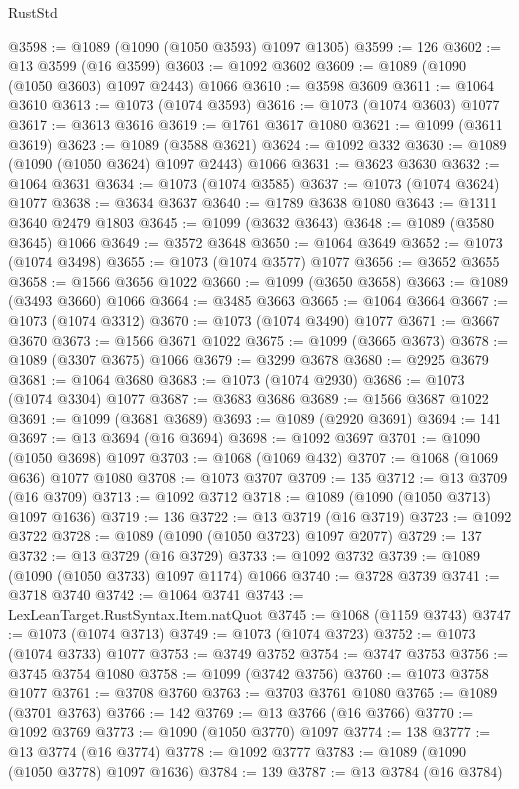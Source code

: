\begin{lexlean}{RustStd}
\begin{coremodule}
{\begin{coremodule}
{{{{{{{{{{{{{{@3598 := @1089 (@1090 (@1050 @3593) @1097 @1305)
@3599 := 126
@3602 := @13 @3599 (@16 @3599)
@3603 := @1092 @3602
@3609 := @1089 (@1090 (@1050 @3603) @1097 @2443) @1066
@3610 := @3598 @3609
@3611 := @1064 @3610
@3613 := @1073 (@1074 @3593)
@3616 := @1073 (@1074 @3603) @1077
@3617 := @3613 @3616
@3619 := @1761 @3617 @1080
@3621 := @1099 (@3611 @3619)
@3623 := @1089 (@3588 @3621)
@3624 := @1092 @332
@3630 := @1089 (@1090 (@1050 @3624) @1097 @2443) @1066
@3631 := @3623 @3630
@3632 := @1064 @3631
@3634 := @1073 (@1074 @3585)
@3637 := @1073 (@1074 @3624) @1077
@3638 := @3634 @3637
@3640 := @1789 @3638 @1080
@3643 := @1311 @3640 @2479 @1803
@3645 := @1099 (@3632 @3643)
@3648 := @1089 (@3580 @3645) @1066
@3649 := @3572 @3648
@3650 := @1064 @3649
@3652 := @1073 (@1074 @3498)
@3655 := @1073 (@1074 @3577) @1077
@3656 := @3652 @3655
@3658 := @1566 @3656 @1022
@3660 := @1099 (@3650 @3658)
@3663 := @1089 (@3493 @3660) @1066
@3664 := @3485 @3663
@3665 := @1064 @3664
@3667 := @1073 (@1074 @3312)
@3670 := @1073 (@1074 @3490) @1077
@3671 := @3667 @3670
@3673 := @1566 @3671 @1022
@3675 := @1099 (@3665 @3673)
@3678 := @1089 (@3307 @3675) @1066
@3679 := @3299 @3678
@3680 := @2925 @3679
@3681 := @1064 @3680
@3683 := @1073 (@1074 @2930)
@3686 := @1073 (@1074 @3304) @1077
@3687 := @3683 @3686
@3689 := @1566 @3687 @1022
@3691 := @1099 (@3681 @3689)
@3693 := @1089 (@2920 @3691)
@3694 := 141
@3697 := @13 @3694 (@16 @3694)
@3698 := @1092 @3697
@3701 := @1090 (@1050 @3698) @1097
@3703 := @1068 (@1069 @432)
@3707 := @1068 (@1069 @636) @1077 @1080
@3708 := @1073 @3707
@3709 := 135
@3712 := @13 @3709 (@16 @3709)
@3713 := @1092 @3712
@3718 := @1089 (@1090 (@1050 @3713) @1097 @1636)
@3719 := 136
@3722 := @13 @3719 (@16 @3719)
@3723 := @1092 @3722
@3728 := @1089 (@1090 (@1050 @3723) @1097 @2077)
@3729 := 137
@3732 := @13 @3729 (@16 @3729)
@3733 := @1092 @3732
@3739 := @1089 (@1090 (@1050 @3733) @1097 @1174) @1066
@3740 := @3728 @3739
@3741 := @3718 @3740
@3742 := @1064 @3741
@3743 := LexLeanTarget.RustSyntax.Item.natQuot
@3745 := @1068 (@1159 @3743)
@3747 := @1073 (@1074 @3713)
@3749 := @1073 (@1074 @3723)
@3752 := @1073 (@1074 @3733) @1077
@3753 := @3749 @3752
@3754 := @3747 @3753
@3756 := @3745 @3754 @1080
@3758 := @1099 (@3742 @3756)
@3760 := @1073 @3758 @1077
@3761 := @3708 @3760
@3763 := @3703 @3761 @1080
@3765 := @1089 (@3701 @3763)
@3766 := 142
@3769 := @13 @3766 (@16 @3766)
@3770 := @1092 @3769
@3773 := @1090 (@1050 @3770) @1097
@3774 := 138
@3777 := @13 @3774 (@16 @3774)
@3778 := @1092 @3777
@3783 := @1089 (@1090 (@1050 @3778) @1097 @1636)
@3784 := 139
@3787 := @13 @3784 (@16 @3784)
}}}}}}}}}}}}}}
\end{coremodule}}
\end{coremodule}
\end{lexlean}

